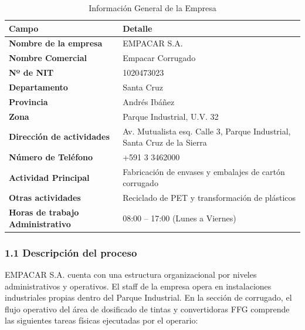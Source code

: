 \documentclass[11pt, letterpaper]{article}
\begin{document}
\begin{table}[H]
    \centering
    \small
    \caption{Información General de la Empresa}
    \begin{tabular}{lp{10cm}}
        \toprule
        \textbf{Campo} & \textbf{Detalle} \\
        \midrule
        \textbf{Nombre de la empresa} & EMPACAR S.A. \\
        \textbf{Nombre Comercial} & Empacar Corrugado \\
        \textbf{Nº de NIT} & 1020473023 \\
        \textbf{Departamento} & Santa Cruz \\
        \textbf{Provincia} & Andrés Ibáñez \\
        \textbf{Zona} & Parque Industrial, U.V. 32 \\
        \textbf{Dirección de actividades} & Av. Mutualista esq. Calle 3, Parque Industrial, Santa Cruz de la Sierra \\
        \textbf{Número de Teléfono} & +591 3 3462000 \\
        \textbf{Actividad Principal} & Fabricación de envases y embalajes de cartón corrugado \\
        \textbf{Otras actividades} & Reciclado de PET y transformación de plásticos \\
        \textbf{Horas de trabajo Administrativo} & 08:00 -- 17:00 (Lunes a Viernes) \\
        \bottomrule
    \end{tabular}
\end{table}

\subsubsection{1.1 Descripción del proceso}
EMPACAR S.A. cuenta con una estructura organizacional por niveles administrativos y operativos. El staff de la empresa opera en instalaciones industriales propias dentro del Parque Industrial. En la sección de corrugado, el flujo operativo del área de dosificado de tintas y convertidoras FFG comprende las siguientes tareas físicas ejecutadas por el operario:
\end{document}
